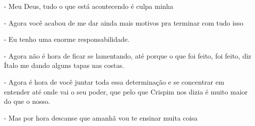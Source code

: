 - Meu Deus, tudo o que está acontecendo é culpa minha

- Agora você acabou de me dar ainda mais motivos pra terminar com tudo isso

- Eu tenho uma enorme responsabilidade.

- Agora não é hora de ficar se lamentando, até porque o que foi feito, foi feito, diz Ítalo me dando alguns tapas nas costas.

- Agora é hora de você juntar toda essa determinação e se concentrar em entender até onde vai o seu poder, que pelo que Crispim nos dizia é muito maior do que o nosso.

- Mas por hora descanse que amanhã vou te ensinar muita coisa


